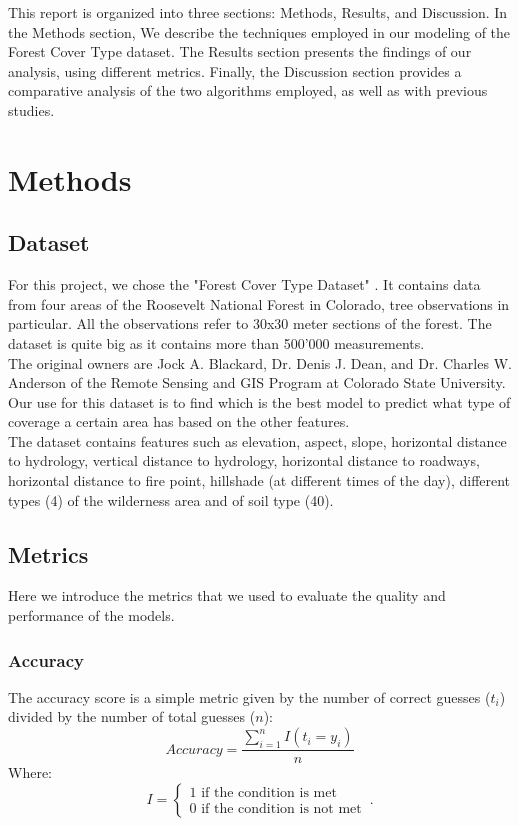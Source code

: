 \documentclass[letterpaper,12pt]{article}
\begin{document}
\par This report is organized into three sections: Methods, Results, and Discussion. In the Methods section, We describe the techniques employed in our modeling of the Forest Cover Type dataset. The Results section presents the findings of our analysis, using different metrics. Finally, the Discussion section provides a comparative analysis of the two algorithms employed, as well as with previous studies.

\newpage
\section{Methods}

\subsection{Dataset}

For this project, we chose the "Forest Cover Type Dataset" \cite{forestcovertype}. It contains data from four areas of the Roosevelt National Forest in Colorado, tree observations in particular. 
All the observations refer to 30x30 meter sections of the forest. The dataset is quite big as it contains more than 500'000 measurements.\\
The original owners are Jock A. Blackard, Dr. Denis J. Dean, and Dr. Charles W. Anderson of the Remote Sensing and GIS Program at Colorado State University.\\
Our use for this dataset is to find which is the best model to predict what type of coverage a certain area has based on the other features.\\
The dataset contains features such as elevation, aspect, slope, horizontal distance to hydrology, vertical distance to hydrology, horizontal distance to roadways, horizontal distance to fire point, hillshade (at different times of the day), different types (4) of the wilderness area and of soil type (40).


\subsection{Metrics}
Here we introduce the metrics that we used to evaluate the quality and performance of the models.
\subsubsection{Accuracy}
The accuracy score is a simple metric given by the number of correct guesses ($t_i$) divided by the number of total guesses ($n$):
    \begin{equation}
        Accuracy = \frac{\sum_{i=1}^nI(t_i=y_i)}{n}
    \end{equation}
Where:
    \begin{equation}
        I = \begin{cases}
            1 \text{ if the condition is met}\\
            0 \text{ if the condition is not met}
            \end{cases}\,.
    \end{equation}
    
\end{document}
